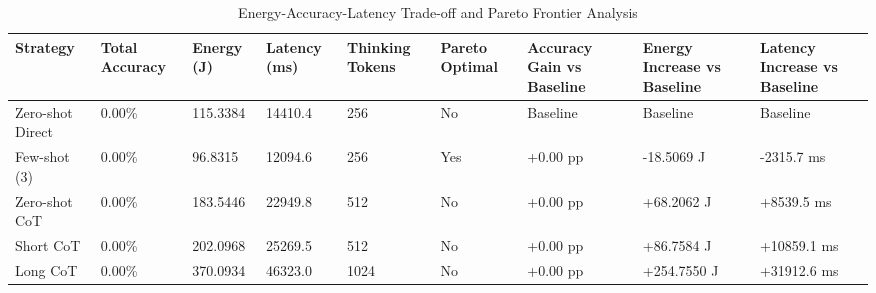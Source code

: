 \begin{table}
\caption{Energy-Accuracy-Latency Trade-off and Pareto Frontier Analysis}
\label{tab:tradeoff_comparison}
\begin{tabular}{lllllllll}
\toprule
Strategy & Total Accuracy & Energy (J) & Latency (ms) & Thinking Tokens & Pareto Optimal & Accuracy Gain vs Baseline & Energy Increase vs Baseline & Latency Increase vs Baseline \\
\midrule
Zero-shot Direct & 0.00\% & 115.3384 & 14410.4 & 256 & No & Baseline & Baseline & Baseline \\
Few-shot (3) & 0.00\% & 96.8315 & 12094.6 & 256 & Yes & +0.00 pp & -18.5069 J & -2315.7 ms \\
Zero-shot CoT & 0.00\% & 183.5446 & 22949.8 & 512 & No & +0.00 pp & +68.2062 J & +8539.5 ms \\
Short CoT & 0.00\% & 202.0968 & 25269.5 & 512 & No & +0.00 pp & +86.7584 J & +10859.1 ms \\
Long CoT & 0.00\% & 370.0934 & 46323.0 & 1024 & No & +0.00 pp & +254.7550 J & +31912.6 ms \\
\bottomrule
\end{tabular}
\end{table}
